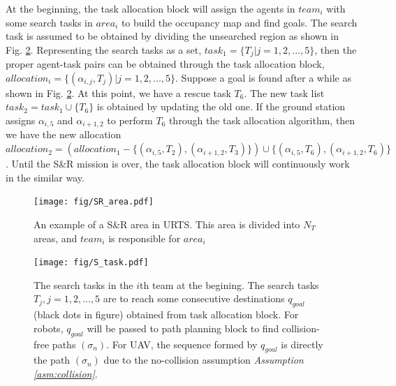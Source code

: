 \documentclass{ieeeaccess}
\begin{document}
At the beginning, the task allocation block will assign the agents in $team_i$ with some search tasks in $area_i$ to build the occupancy map and find goals. The search task is assumed to be obtained by dividing the unsearched region as shown in Fig. \ref{fig:S_task}. Representing the search tasks as a set, $task_1=\{ T_j | j=1,2,...,5 \}$, then the proper agent-task pairs can be obtained through the task allocation block, $allocation_i=\{ (\alpha_{i,j},T_j) | j=1,2,...,5 \}$. Suppose a goal is found after a while as shown in Fig. \ref{fig:S_task}. At this point, we have a rescue task $T_6$. The new task list $task_2=task_1\cup\{ T_6 \}$ is obtained by updating the old one. If the ground station assigns $\alpha_{i,5}$ and $\alpha_{i+1,2}$ to perform $T_6$ through the task allocation algorithm, then we have the new allocation $allocation_2=(allocation_1-\{ (\alpha_{i,5},T_2),(\alpha_{i+1,2},T_3) \})\cup\{ (\alpha_{i,5},T_6),(\alpha_{i+1,2},T_6) \}$. Until the S\&R mission is over, the task allocation block will continuously work in the similar way.
\begin{figure}[htbp]
    \centering
    \texttt{[image: fig/SR\_area.pdf]}\caption{An example of a S\&R area in URTS. This area is divided into $N_T$ areas, and $team_i$ is responsible for $area_i$}%
    \label{fig:SR_area}
\end{figure}
\begin{figure}[htbp]
    \centering
    \texttt{[image: fig/S\_task.pdf]}\caption{The search tasks in the $i$th team at the begining. The search tasks $T_j,j=1,2,...,5$ are to reach some consecutive destinations $q_{goal}$ (black dots in figure) obtained from task allocation block. For robots, $q_{goal}$ will be passed to path planning block to find collision-free paths $(\sigma_n)$. For UAV, the sequence formed by $q_{goal}$ is directly the path $(\sigma_n)$ due to the no-collision assumption \textit{Assumption \ref{asm:collision}}.}
    \label{fig:S_task}
\end{figure}
\end{document}
